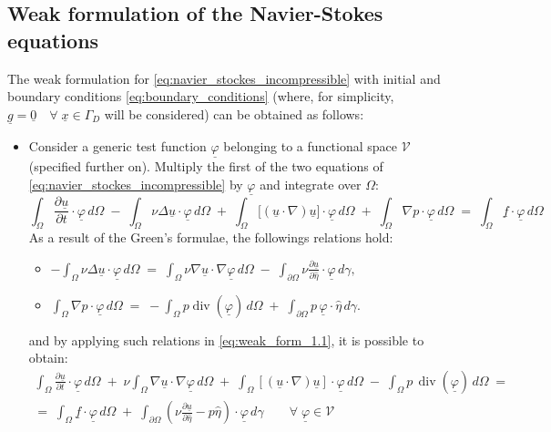 \documentclass[11pt,a4paper]{article}
\renewcommand{\vec}[1]{\underline{#1}} %
\let\oldforall\forall
\renewcommand{\forall}{\oldforall \; }
\DeclareMathOperator{\Div}{div}
\begin{document}
\subsection{Weak formulation of the Navier-Stokes equations}
The weak formulation for \eqref{eq:navier_stockes_incompressible} with initial and boundary conditions \eqref{eq:boundary_conditions} (where, for simplicity, $\vec{g} = \vec{0} \quad \forall \vec{x} \in \Gamma_{D}$ will be considered) can be obtained as follows: 
\begin{itemize}
    \item Consider a generic test function $\vec{\varphi}$ belonging to a functional space $\mathcal{V}$ (specified further on). Multiply the first of the two equations of \eqref{eq:navier_stockes_incompressible} by $\vec{\varphi}$ and integrate over $\Omega$: 
    \begin{equation}
        \label{eq:weak_form_1.1}
        \int_{\Omega} \frac{\partial \vec{u}}{\partial t} \cdot \vec{\varphi} \, d\Omega \;-\;\int_{\Omega} \nu \Delta \vec{u} \cdot \vec{\varphi} \, d\Omega \;+\; \int_{\Omega} \bigl[ (\vec{u}\cdot\nabla)\vec{u} \bigr] \cdot \vec{\varphi} \, d\Omega \;+\; \int_{\Omega} \nabla p \cdot \vec{\varphi} \, d\Omega \;=\; \int_{\Omega} \vec{f}\cdot \vec{\varphi} \, d\Omega
    \end{equation}
    As a result of the Green's formulae, the followings relations hold:
    \begin{itemize}
        \item $\displaystyle - \int_{\Omega} \nu \Delta \vec{u} \cdot \vec{\varphi} \, d\Omega \; = \; \int_{\Omega} \nu \nabla \vec{u} \cdot \nabla \vec{\varphi} \, d\Omega \; - \; \int_{\partial \Omega} \nu \frac{\partial \vec{u}}{\partial \hat{\eta}} \cdot \vec{\varphi} \, d\gamma,$
        \item $\displaystyle \int_{\Omega} \nabla p \cdot \vec{\varphi} \, d\Omega \; = \; - \int_{\Omega} p \Div(\vec{\varphi}) \, d\Omega \; + \; \int_{\partial \Omega} p \, \vec{\varphi} \cdot \hat{\eta} \, d\gamma.$
    \end{itemize}
    and by applying such relations in \eqref{eq:weak_form_1.1}, it is possible to obtain:
    \begin{equation}
    \begin{aligned}
        \int_{\Omega} \frac{\partial \vec{u}}{\partial t} \cdot \vec{\varphi} \,  d\Omega \; + \; \nu \int_{\Omega} \nabla \vec{u} \cdot \nabla \vec{\varphi}  \, d\Omega \; + \; \int_{\Omega} [ (\vec{u} \cdot \nabla) \vec{u}] \cdot \vec{\varphi} \, d\Omega \; - \; \int_{\Omega} p \, \Div \left( \vec{\varphi} \right) \, d\Omega \; = \\
        = \; \int_{\Omega} \vec{f} \cdot \vec{\varphi} \, d\Omega \; + \; \int_{\partial \Omega} \left( \nu \frac{\partial \vec{u}}{\partial \hat{\eta}} - p \hat{\eta} \right) \cdot \vec{\varphi}  \, d\gamma \qquad \forall \vec{\varphi} \in \mathcal{V}
        \end{aligned}
    \end{equation}


\end{itemize}
\end{document}
